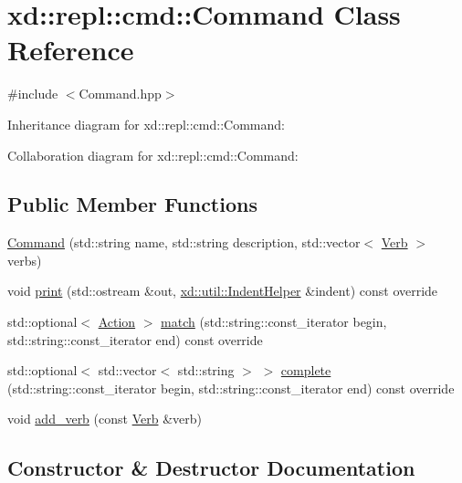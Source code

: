 \hypertarget{classxd_1_1repl_1_1cmd_1_1_command}{}\section{xd\+:\+:repl\+:\+:cmd\+:\+:Command Class Reference}
\label{classxd_1_1repl_1_1cmd_1_1_command}


{\ttfamily \#include $<$Command.\+hpp$>$}



Inheritance diagram for xd\+:\+:repl\+:\+:cmd\+:\+:Command\+:


Collaboration diagram for xd\+:\+:repl\+:\+:cmd\+:\+:Command\+:
\subsection*{Public Member Functions}
\begin{DoxyCompactItemize}
\item 
\mbox{\hyperlink{classxd_1_1repl_1_1cmd_1_1_command_a986928975c8a19520481c44c8af002ee}{Command}} (std\+::string name, std\+::string description, std\+::vector$<$ \mbox{\hyperlink{classxd_1_1repl_1_1cmd_1_1_verb}{Verb}} $>$ verbs)
\item 
void \mbox{\hyperlink{classxd_1_1repl_1_1cmd_1_1_command_ae10301038c77c9226c6bb6c7c0ad85c8}{print}} (std\+::ostream \&out, \mbox{\hyperlink{classxd_1_1util_1_1_indent_helper}{xd\+::util\+::\+Indent\+Helper}} \&indent) const override
\item 
std\+::optional$<$ \mbox{\hyperlink{namespacexd_1_1repl_1_1cmd_a7274841bd02a9c5da0ba48ae204ab3d5}{Action}} $>$ \mbox{\hyperlink{classxd_1_1repl_1_1cmd_1_1_command_ae36dbba2be732b38ebdac47c504fe91d}{match}} (std\+::string\+::const\+\_\+iterator begin, std\+::string\+::const\+\_\+iterator end) const override
\item 
std\+::optional$<$ std\+::vector$<$ std\+::string $>$ $>$ \mbox{\hyperlink{classxd_1_1repl_1_1cmd_1_1_command_a5bb19b12a99fe48052c346db999942de}{complete}} (std\+::string\+::const\+\_\+iterator begin, std\+::string\+::const\+\_\+iterator end) const override
\item 
void \mbox{\hyperlink{classxd_1_1repl_1_1cmd_1_1_command_a6f855c759e4d23f38f6286b4712251d4}{add\+\_\+verb}} (const \mbox{\hyperlink{classxd_1_1repl_1_1cmd_1_1_verb}{Verb}} \&verb)
\end{DoxyCompactItemize}


\subsection{Constructor \& Destructor Documentation}
\mbox{\label{classxd_1_1repl_1_1cmd_1_1_command_a986928975c8a19520481c44c8af002ee}} 
